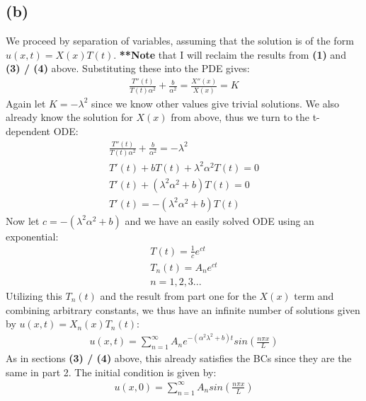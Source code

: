 \documentclass{article}
\begin{document}
\subsection*{\textbf{(b)}}
We proceed by separation of variables, assuming that the solution is of the form $u(x,t) = X(x)T(t)$. \textbf{**Note} that I will reclaim the results from \textbf{(1)} and \textbf{(3) / (4)} above. Substituting these into the PDE gives:
\begin{equation}
\begin{aligned}
\frac{T''(t)}{T(t)\alpha^2}+\frac{b}{\alpha^2} = \frac{X''(x)}{X(x)} = K 
\end{aligned}
\end{equation}
Again let $K=-\lambda^2$ since we know other values give trivial solutions. We also already know the solution for $X(x)$ from above, thus we turn to the t-dependent ODE:
\begin{equation}
\begin{aligned}
\frac{T''(t)}{T(t)\alpha^2}+\frac{b}{\alpha^2} = -\lambda^2\\
T'(t) + bT(t) + \lambda^2\alpha^2T(t) = 0\\
T'(t) + (\lambda^2\alpha^2+b)T(t) = 0\\
T'(t) = -(\lambda^2\alpha^2 + b)T(t)
\end{aligned}
\end{equation}
Now let $c=-(\lambda^2\alpha^2 + b)$ and we have an easily solved ODE using an exponential:
\begin{equation}
\begin{aligned}
T(t) = \frac{1}{c}e^{ct}\\
T_n(t) = A_ne^{ct}\\
n = 1,2,3...
\end{aligned}
\end{equation}
Utilizing this $T_n(t)$ and the result from part one for the $X(x)$ term and combining arbitrary constants, we thus have an infinite number of solutions given by $u(x,t) = X_n(x)T_n(t)$:
\begin{equation}
\begin{aligned}
u(x,t) = \sum_{n=1}^\infty A_ne^{-(\alpha^2\lambda^2 + b)t}sin(\frac{n\pi x}{L})
\end{aligned}
\end{equation}
As in sections \textbf{(3) / (4)} above, this already satisfies the BCs since they are the same in part 2. The initial condition is given by:
\begin{equation}
\begin{aligned}
u(x,0) = \sum_{n=1}^\infty A_nsin(\frac{n\pi x}{L})
\end{aligned}
\end{equation}
\end{document}
